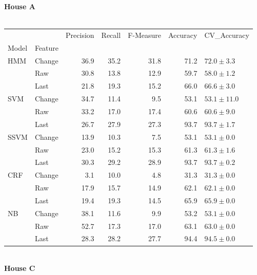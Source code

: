 \documentclass{article}
\begin{document}
\textbf{House A}\\
\vspace{1cm}\\
\begin{tabular}{llrrrrl}
\toprule
    &        &  Precision &  Recall &  F-Measure &  Accuracy &    CV\_Accuracy \\
Model & Feature &            &         &            &           &                \\
\midrule
HMM & Change &       36.9 &    35.2 &       31.8 &      71.2 &   $72.0\pm3.3$ \\
    & Raw &       30.8 &    13.8 &       12.9 &      59.7 &   $58.0\pm1.2$ \\
    & Last &       21.8 &    19.3 &       15.2 &      66.0 &   $66.6\pm3.0$ \\
SVM & Change &       34.7 &    11.4 &        9.5 &      53.1 &  $53.1\pm11.0$ \\
    & Raw &       33.2 &    17.0 &       17.4 &      60.6 &   $60.6\pm9.0$ \\
    & Last &       26.7 &    27.9 &       27.3 &      93.7 &   $93.7\pm1.7$ \\
SSVM & Change &       13.9 &    10.3 &        7.5 &      53.1 &   $53.1\pm0.0$ \\
    & Raw &       23.0 &    15.2 &       15.3 &      61.3 &   $61.3\pm1.6$ \\
    & Last &       30.3 &    29.2 &       28.9 &      93.7 &   $93.7\pm0.2$ \\
CRF & Change &        3.1 &    10.0 &        4.8 &      31.3 &   $31.3\pm0.0$ \\
    & Raw &       17.9 &    15.7 &       14.9 &      62.1 &   $62.1\pm0.0$ \\
    & Last &       19.4 &    19.3 &       14.5 &      65.9 &   $65.9\pm0.0$ \\
NB & Change &       38.1 &    11.6 &        9.9 &      53.2 &   $53.1\pm0.0$ \\
    & Raw &       52.7 &    17.3 &       17.0 &      63.1 &   $63.0\pm0.0$ \\
    & Last &       28.3 &    28.2 &       27.7 &      94.4 &   $94.5\pm0.0$ \\
\bottomrule
\end{tabular}
\vspace{1cm}\\
\textbf{House C}\\
\vspace{1cm}\\
\end{document}
